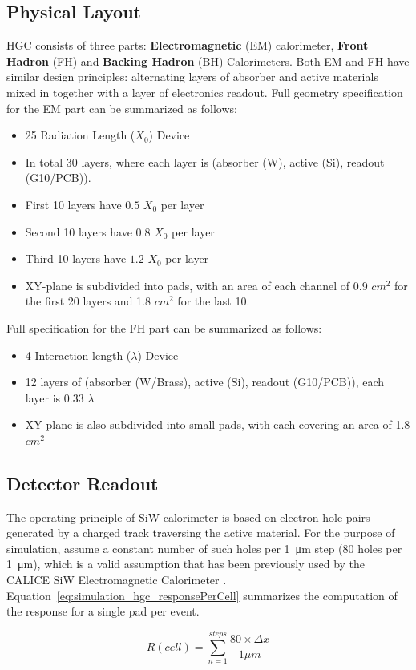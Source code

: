 \subsection{Physical Layout}
HGC consists of three parts: \textbf{Electromagnetic} (EM) calorimeter, \textbf{Front Hadron} (FH) and \textbf{Backing Hadron} (BH) Calorimeters. Both EM and FH have similar design principles: alternating layers of absorber and active materials mixed in together with a layer of electronics readout. Full geometry specification for the EM part can be summarized as follows:
\begin{itemize}
    \item 25 Radiation Length ($X_{0}$) Device
    \item In total 30 layers, where each layer is (absorber (W), active (Si), readout (G10/PCB)).
    \item First 10 layers have $0.5$ $X_{0}$ per layer
    \item Second 10 layers have $0.8$ $X_{0}$ per layer
    \item Third 10 layers have $1.2$ $X_{0}$ per layer
    \item XY-plane is subdivided into pads, with an area of each channel of 0.9 $cm^2$ for the first 20 layers and 1.8 $cm^2$ for the last 10.
\end{itemize}
Full specification for the FH part can be summarized as follows:
\begin{itemize}
    \item 4 Interaction length ($\lambda$) Device
    \item 12 layers of (absorber (W/Brass), active (Si), readout (G10/PCB)), each layer is $0.33$ $\lambda$
    \item XY-plane is also subdivided into small pads, with each covering an area of 1.8 $cm^2$
\end{itemize}

\subsection{Detector Readout} \label{subsection:simulations_hgc_readout}
The operating principle of SiW calorimeter is based on electron-hole pairs generated by a charged track traversing the active material. For the purpose of simulation, assume a constant number of such holes per \SI{1}{\micro\metre} step (80 holes per \SI{1}{\micro\metre}), which is a valid assumption that has been previously used by the {\sc CALICE} SiW Electromagnetic Calorimeter \cite{Adloff:2008aa}. Equation~\ref{eq:simulation_hgc_responsePerCell} summarizes the computation of the response for a single pad per event.
\begin{center}
    \begin{equation}
        \label{eq:simulation_hgc_responsePerCell}
        {R(cell)} = {\sum_{n=1}^{steps} \frac{80\times \Delta x}{1\mu m}}
   \end{equation}
\end{center}

